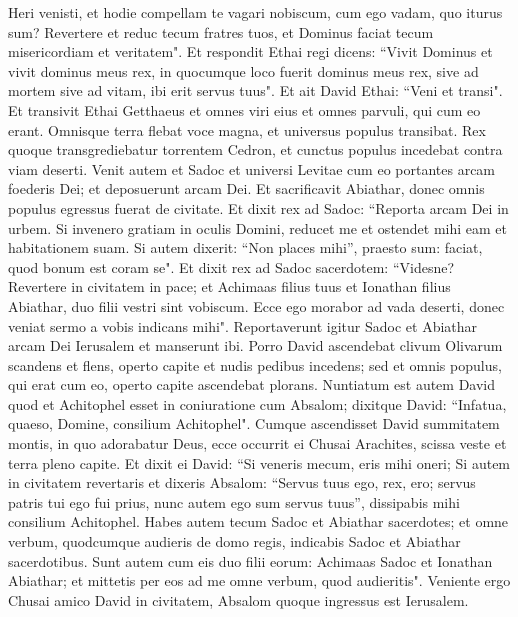 \begin{biblechapter}
\verse Heri venisti, et hodie compellam te vagari nobiscum, cum ego vadam, quo iturus sum? Revertere et reduc tecum fratres tuos, et Dominus faciat tecum misericordiam et veritatem". 
\verse Et respondit Ethai regi dicens: “Vivit Dominus et vivit dominus meus rex, in quocumque loco fuerit dominus meus rex, sive ad mortem sive ad vitam, ibi erit servus tuus". 
\verse Et ait David Ethai: “Veni et transi". Et transivit Ethai Getthaeus et omnes viri eius et omnes parvuli, qui cum eo erant. 
\verse Omnisque terra flebat voce magna, et universus populus transibat. Rex quoque transgrediebatur torrentem Cedron, et cunctus populus incedebat contra viam deserti. 
\verse Venit autem et Sadoc et universi Levitae cum eo portantes arcam foederis Dei; et deposuerunt arcam Dei. Et sacrificavit Abiathar, donec omnis populus egressus fuerat de civitate. 
\verse Et dixit rex ad Sadoc: “Reporta arcam Dei in urbem. Si invenero gratiam in oculis Domini, reducet me et ostendet mihi eam et habitationem suam. 
\verse Si autem dixerit: “Non places mihi”, praesto sum: faciat, quod bonum est coram se". 
\verse Et dixit rex ad Sadoc sacerdotem: “Videsne? Revertere in civitatem in pace; et Achimaas filius tuus et Ionathan filius Abiathar, duo filii vestri sint vobiscum. 
\verse Ecce ego morabor ad vada deserti, donec veniat sermo a vobis indicans mihi". 
\verse Reportaverunt igitur Sadoc et Abiathar arcam Dei Ierusalem et manserunt ibi. 
\verse Porro David ascendebat clivum Olivarum scandens et flens, operto capite et nudis pedibus incedens; sed et omnis populus, qui erat cum eo, operto capite ascendebat plorans. 
\verse Nuntiatum est autem David quod et Achitophel esset in coniuratione cum Absalom; dixitque David: “Infatua, quaeso, Domine, consilium Achitophel". 
\verse Cumque ascendisset David summitatem montis, in quo adorabatur Deus, ecce occurrit ei Chusai Arachites, scissa veste et terra pleno capite. 
\verse Et dixit ei David: “Si veneris mecum, eris mihi oneri; 
\verse Si autem in civitatem revertaris et dixeris Absalom: “Servus tuus ego, rex, ero; servus patris tui ego fui prius, nunc autem ego sum servus tuus”, dissipabis mihi consilium Achitophel. 
\verse Habes autem tecum Sadoc et Abiathar sacerdotes; et omne verbum, quodcumque audieris de domo regis, indicabis Sadoc et Abiathar sacerdotibus. 
\verse Sunt autem cum eis duo filii eorum: Achimaas Sadoc et Ionathan Abiathar; et mittetis per eos ad me omne verbum, quod audieritis". 
\verse Veniente ergo Chusai amico David in civitatem, Absalom quoque ingressus est Ierusalem. 
\end{biblechapter}

